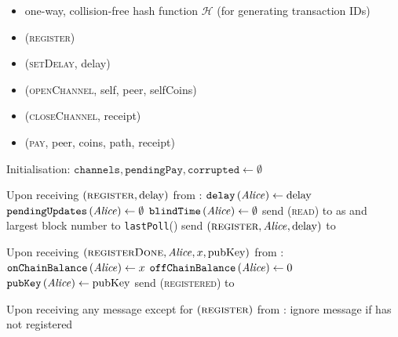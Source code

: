 \begin{functionality}{\fpaynet}
  \label{alg:payfunc}
    \begin{itemize}
      \item one-way, collision-free hash function $\mathcal{H}$ (for generating
      transaction IDs)
    \end{itemize}

    \begin{itemize}
      \item (\textsc{register})
      \item (\textsc{setDelay}, delay)
      \item (\textsc{openChannel}, self, peer, selfCoins)
      \item (\textsc{closeChannel}, receipt)
      \item (\textsc{pay}, peer, coins, path, receipt)
    \end{itemize}

  \begin{algorithmic}[1]
    \State Initialisation:
    \Indent
      \State $\mathtt{channels}, \mathtt{pendingPay}, \mathtt{corrupted} \gets
      \emptyset$
    \EndIndent
    \State
  \end{algorithmic}

  \begin{algorithmic}[1]
    \State Upon receiving $\left(\textsc{register}, \mathrm{delay}\right)$ from
    \alice:
    \Indent
      \State $\mathtt{delay}\left(\mathit{Alice}\right) \gets \mathrm{delay}$
      \State $\mathtt{pendingUpdates}\left(\mathit{Alice}\right) \gets \emptyset$
      \State $\mathtt{blindTime}\left(\mathit{Alice}\right) \gets \emptyset$
      \State send (\textsc{read}) to \ledger{} as \alice{} and largest block
      number to \texttt{lastPoll}(\alice)
      \State send $\left(\textsc{register}, \mathit{Alice}, \mathrm{delay}\right)$ to
      \simulator
    \EndIndent
    \State

    \State Upon receiving $\left(\textsc{registerDone}, \mathit{Alice}, x,
    \mathrm{pubKey}\right)$ from \simulator:
    \Indent
      \State $\mathtt{onChainBalance}\left(\mathit{Alice}\right) \gets x$
      \State $\mathtt{offChainBalance}\left(\mathit{Alice}\right) \gets 0$
      \State $\mathtt{pubKey}\left(\mathit{Alice}\right) \gets \mathrm{pubKey}$
      \State send (\textsc{registered}) to \alice
    \EndIndent
    \State

    \State Upon receiving any message except for
    $\left(\textsc{register}\right)$ from \alice:
    \Indent
      \State ignore message if \alice{} has not registered
    \EndIndent
    \State


\end{algorithmic}
\end{functionality}
